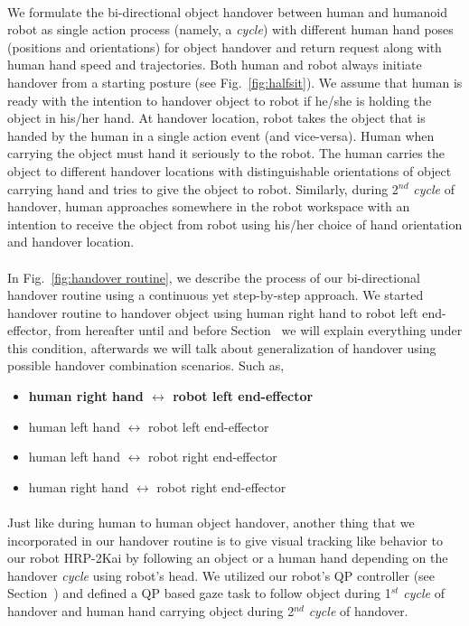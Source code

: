 \documentclass[a4paper, 12pt, oneside]{Thesis}  %
\begin{document}
\paragraph*{}
We formulate the bi-directional object handover between human and humanoid robot as single action process (namely, a \textit{cycle}) with different human hand poses (positions and orientations) for object handover and return request along with human hand speed and trajectories. Both human and robot always initiate handover from a starting posture (see Fig.~\ref{fig:halfsit}). We assume that human is ready with the intention to handover object to robot if he/she is holding the object in his/her hand. At handover location, robot takes the object that is handed by the human in a single action event (and vice-versa). Human when carrying the object must hand it seriously to the robot. The human carries the object to different handover locations with distinguishable orientations of object carrying hand and tries to give the object to robot. Similarly, during 2$^{nd}$ \textit{cycle} of handover, human approaches somewhere in the robot workspace with an intention to receive the object from robot using his/her choice of hand orientation and handover location. 


\paragraph*{}
In Fig.~\ref{fig:handover routine}, we describe the process of our bi-directional handover routine using a continuous yet step-by-step approach. We started handover routine to handover object using human right hand to robot left end-effector, from hereafter until and before Section~ we will explain everything under this condition, afterwards we will talk about generalization of handover using possible handover combination scenarios. Such as,

\begin{itemize}
    \item \textbf{human right hand $\longleftrightarrow$ robot left end-effector}
    \item human left hand $\longleftrightarrow$ robot left end-effector 
    \item human left hand $\longleftrightarrow$  robot right end-effector
    \item human right hand $\longleftrightarrow$ robot right end-effector
\end{itemize}

\paragraph*{}
Just like during human to human object handover, another thing that we incorporated in our handover routine is to give visual tracking like behavior to our robot HRP-2Kai by following an object or a human hand depending on the handover \textit{cycle} using robot's head. We utilized our robot's QP controller (see Section~) and defined a QP based gaze task to follow object during 1$^{st}$ \textit{cycle} of handover and human hand carrying object during 2$^{nd}$ \textit{cycle} of handover.
\end{document}
